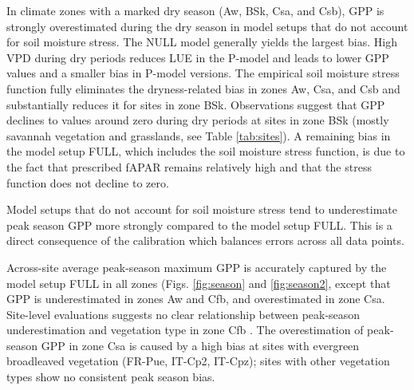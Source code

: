 \documentclass{myreport}
\begin{document}
In climate zones with a marked dry season (Aw, BSk, Csa, and Csb), GPP is strongly overestimated during the dry season in model setups that do not account for soil moisture stress. The NULL model generally yields the largest bias. High VPD during dry periods reduces LUE in the P-model and leads to lower GPP values and a smaller bias in P-model versions. The empirical soil moisture stress function fully eliminates the dryness-related bias in zones Aw, Csa, and Csb and substantially reduces it for sites in zone BSk. Observations suggest that GPP declines to values around zero during dry periods at sites in zone BSk (mostly savannah vegetation and grasslands, see Table \ref{tab:sites}). A remaining bias in the model setup FULL, which includes the soil moisture stress function, is due to the fact that prescribed fAPAR remains relatively high and that the stress function does not decline to zero.

Model setups that do not account for soil moisture stress tend to underestimate peak season GPP more strongly compared to the model setup FULL. This is a direct consequence of the calibration which balances errors across all data points.

Across-site average peak-season maximum GPP is accurately captured by the model setup FULL in all zones (Figs. \ref{fig:season} and \ref{fig:season2}, except that GPP is underestimated in zones Aw and Cfb, and overestimated in zone Csa. Site-level evaluations suggests no clear relationship between peak-season underestimation and vegetation type in zone Cfb . The overestimation of peak-season GPP in zone Csa is caused by a high bias at sites with evergreen broadleaved vegetation (FR-Pue, IT-Cp2, IT-Cpz); sites with other vegetation types show no consistent peak season bias. 
\end{document}
